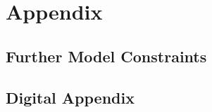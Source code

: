 \chapter{Appendix}
\setcounter{table}{0}
\setcounter{figure}{0}
\renewcommand{\thefigure}{A.\arabic{figure}}
\renewcommand{\thetable}{A.\arabic{table}}


\section{Further Model Constraints}
\section{Digital Appendix}